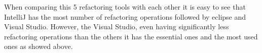 
When comparing this 5 refactoring tools with each other it is easy to see that IntelliJ has the most number of refactoring operations followed by eclipse and Visual Studio. However, the Visual Studio, even having significantly less refactoring operations than the others it has the essential ones and the most used ones as showed above.


 